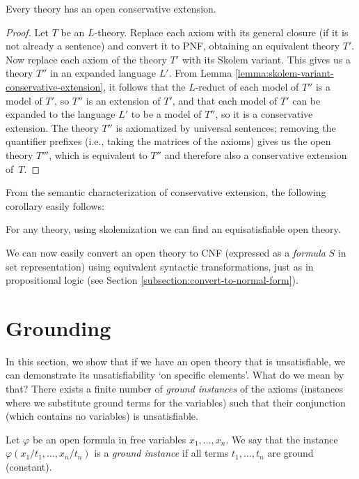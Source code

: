 \begin{theorem}
    Every theory has an open conservative extension.
\end{theorem}
\begin{proof}
    Let $T$ be an $L$-theory. Replace each axiom with its general closure (if it is not already a sentence) and convert it to PNF, obtaining an equivalent theory $T'$. Now replace each axiom of the theory $T'$ with its Skolem variant. This gives us a theory $T''$ in an expanded language $L'$. From Lemma \ref{lemma:skolem-variant-conservative-extension}, it follows that the $L$-reduct of each model of $T''$ is a model of $T'$, so $T''$ is an extension of $T'$, and that each model of $T'$ can be expanded to the language $L'$ to be a model of $T''$, so it is a conservative extension. The theory $T''$ is axiomatized by universal sentences; removing the quantifier prefixes (i.e., taking the matrices of the axioms) gives us the open theory $T'''$, which is equivalent to $T''$ and therefore also a conservative extension of~$T$.
\end{proof}

From the semantic characterization of conservative extension, the following corollary easily follows:

\begin{corollary}
    For any theory, using skolemization we can find an equisatisfiable open theory.
\end{corollary}

We can now easily convert an open theory to CNF (expressed as a \emph{formula} $S$ in set representation) using equivalent syntactic transformations, just as in propositional logic (see Section \ref{subsection:convert-to-normal-form}).


\section{Grounding}\label{section:grounding}

In this section, we show that if we have an open theory that is unsatisfiable, we can demonstrate its unsatisfiability `on specific elements'. What do we mean by that? There exists a finite number of \emph{ground instances} of the axioms (instances where we substitute ground terms for the variables) such that their conjunction (which contains no variables) is unsatisfiable.

\begin{definition}
    Let $\varphi$ be an open formula in free variables $x_1,\dots,x_n$. We say that the instance $\varphi(x_1/t_1,\dots,x_n/t_n)$ is a \emph{ground instance} if all terms $t_1,\dots,t_n$ are ground (constant).
\end{definition}

